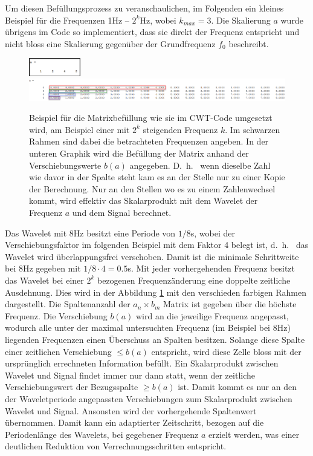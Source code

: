Um diesen Befüllungsprozess zu veranschaulichen, im Folgenden ein kleines Beispiel für die Frequenzen 1Hz – $2^k$Hz, wobei $k_{max} = 3$. Die Skalierung $a$ wurde übrigens im Code so implementiert, dass sie direkt der Frequenz entspricht und nicht bloss eine Skalierung gegenüber der Grundfrequenz $f_0$ beschreibt. 

\begin{figure}
	\centering
	\includegraphics[width=0.2\textwidth]{papers/wavelets/images/17-1_a-Array.png}
	\includegraphics[width=\textwidth]{papers/wavelets/images/17-2_BspFillUp.png}
	\caption{Beispiel für die Matrixbefüllung wie sie im CWT-Code umgesetzt wird, am Beispiel einer mit $2^k$ steigenden Frequenz $k$. Im schwarzen Rahmen sind dabei die betrachteten Frequenzen angeben. In der unteren Graphik wird die Befüllung der Matrix anhand der Verschiebungswerte $b(a)$ angegeben. D.~h.~ wenn dieselbe Zahl wie davor in der Spalte steht kam es an der Stelle nur zu einer Kopie der Berechnung. Nur an den Stellen wo es zu einem Zahlenwechsel kommt, wird effektiv das Skalarprodukt mit dem Wavelet der Frequenz $a$ und dem Signal berechnet.}
	\label{wavelet:fig:BspFillUp}
\end{figure}

Das Wavelet mit 8Hz besitzt eine Periode von $1/8$s, wobei der Verschiebungsfaktor im folgenden Beispiel mit dem Faktor 4 belegt ist, d.~h.~ das Wavelet wird überlappungsfrei verschoben. Damit ist die minimale Schrittweite bei 8Hz gegeben mit $1/8\cdot4=0.5$s. Mit jeder vorhergehenden Frequenz besitzt das Wavelet bei einer $2^k$ bezogenen Frequenzänderung eine doppelte zeitliche Ausdehnung. Dies wird in der Abbildung \ref{wavelet:fig:BspFillUp} mit den verschieden farbigen Rahmen dargestellt. Die Spaltenanzahl der $a_n \times b_m$ Matrix ist gegeben über die höchste Frequenz. Die Verschiebung $b(a)$ wird an die jeweilige Frequenz angepasst, wodurch alle unter der maximal untersuchten Frequenz (im Beispiel bei 8Hz) liegenden Frequenzen einen Überschuss an Spalten besitzen. Solange diese Spalte einer zeitlichen Verschiebung $\leq b(a)$ entspricht, wird diese Zelle bloss mit der ursprünglich errechneten Information befüllt. Ein Skalarprodukt zwischen Wavelet und Signal findet immer nur dann statt, wenn der zeitliche Verschiebungswert der Bezugsspalte $\geq b(a)$ ist. Damit kommt es nur an den der Waveletperiode angepassten Verschiebungen zum Skalarprodukt zwischen Wavelet und Signal. Ansonsten wird der vorhergehende Spaltenwert übernommen. Damit kann ein adaptierter Zeitschritt, bezogen auf die Periodenlänge des Wavelets, bei gegebener Frequenz $a$ erzielt werden, was einer deutlichen Reduktion von Verrechnungsschritten entspricht.

